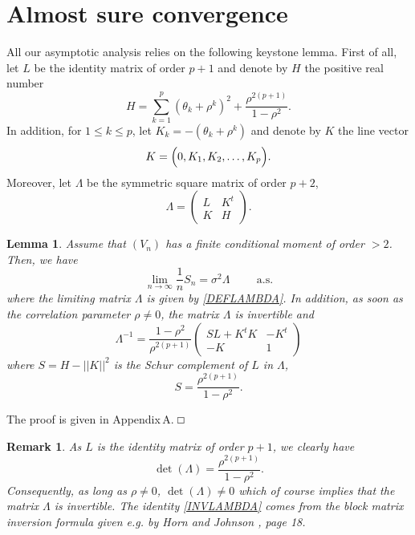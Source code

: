\documentclass[article,12pt]{amsart}
\numberwithin{equation}{section}
\theoremstyle{plain}
\newtheorem{lem}{Lemma}[section]
\newtheorem{rem}{Remark}[section]
\begin{document}
\section{Almost sure convergence}
\label{SectionASC}

All our asymptotic analysis relies on the following keystone lemma.
First of all, let $L$ be the identity matrix of order $p+1$ and denote by $H$ the positive real number
\begin{equation}
\label{DEFH}
H=\sum_{k=1}^p (\theta_k+\rho^k)^2+\frac{\rho^{2(p+1)}}{1-\rho^2}.
\end{equation}
In addition, for $1\leq k \leq p$, let $K_k=-(\theta_k+\rho^k)$ and denote by
$K$ the line vector 
\begin{equation}
\label{DEFK}
K=\Bigl(0,K_1,K_2,\ldots,K_p\Bigr).
\end{equation}
Moreover, let $\Lambda$ be the symmetric square matrix of order $p+2$,
\begin{equation}  
\label{DEFLAMBDA}
\Lambda=\left( 
\begin{array}{cc}
L & K^t \\ 
K &H
\end{array}
\right).
\end{equation}

\begin{lem}
\label{L-CVGSN}
Assume that $(V_n)$ has a finite conditional moment of order $>2$. Then, we have
\begin{equation}
\label{CVGSN}
\lim_{n\rightarrow \infty} \frac{1}{n}S_n=\sigma^2 \Lambda \hspace{1cm} \text{a.s.}
\end{equation}
where the limiting matrix $\Lambda$ is given by \eqref{DEFLAMBDA}.
In addition, as soon as the correlation parameter $\rho \neq 0$, the matrix $\Lambda$ is invertible and
\begin{equation}
\label{INVLAMBDA}
\Lambda^{-1}=\frac{1-\rho^2}{\rho^{2(p+1)}}\left( 
\begin{array}{cc}
SL+K^tK & -K^t \\ 
-K & 1
\end{array}
\right)
\end{equation}
where $S= H- || K ||^2$ is the Schur complement of $L$ in $\Lambda$, 
\begin{equation}
\label{DEFS}
S= \frac{\rho^{2(p+1)}}{1-\rho^2}.
\end{equation}
\end{lem}
The proof is given in Appendix\,A. {\hfill ${\mathbin{\vbox{\hrule\hbox{\vrule height1ex \kern.5em
\vrule height1ex}\hrule}}}$\\}
\vspace{-2ex} 
\begin{rem}
As $L$ is the identity matrix of order $p+1$, we clearly have
\begin{equation*}
\det(\Lambda)=\frac{\rho^{2(p+1)}}{1-\rho^2}.
\end{equation*} 
Consequently, as long as $\rho \neq 0$, $\det(\Lambda) \neq 0$ which of course implies that
the matrix $\Lambda$ is invertible.  The identity \eqref{INVLAMBDA} comes from the block matrix
inversion formula given e.g. by Horn and Johnson \cite{Horn}, page 18.
\end{rem}
\end{document}
